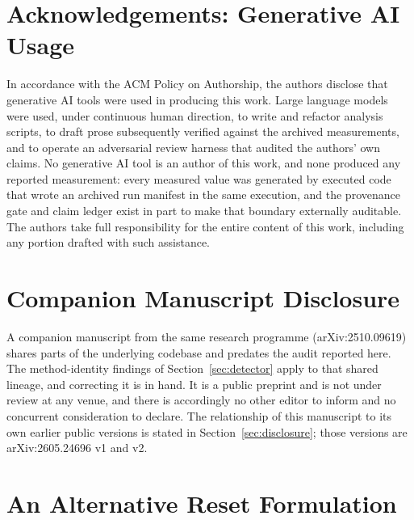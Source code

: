\documentclass[manuscript,screen,nonacm]{acmart}
\begin{document}
\section*{Acknowledgements: Generative AI Usage}
In accordance with the ACM Policy on Authorship, the authors disclose that
generative AI tools were used in producing this work. Large language models
were used, under continuous human direction, to write and refactor analysis
scripts, to draft prose subsequently verified against the archived
measurements, and to operate an adversarial review harness that audited the
authors' own claims. No generative AI tool is an author of this work, and none
produced any reported measurement: every measured value was generated by
executed code that wrote an archived run manifest in the same execution, and the provenance gate
and claim ledger exist in part to make that boundary externally auditable. The
authors take full responsibility for the entire content of this work,
including any portion drafted with such assistance.

\section*{Companion Manuscript Disclosure}
A companion manuscript from the same research programme (arXiv:2510.09619) shares parts of the underlying codebase and
predates the audit reported here. The method-identity findings of
Section~\ref{sec:detector} apply to that shared lineage, and correcting it is
in hand. It is a public preprint and is not under review at any venue, and
there is accordingly no other editor to inform and no concurrent consideration
to declare. The relationship of this manuscript to its own earlier public
versions is stated in Section~\ref{sec:disclosure}; those versions
are arXiv:2605.24696 v1 and v2.




\appendix

\section{An Alternative Reset Formulation}
\label{app:ablation}
\end{document}
